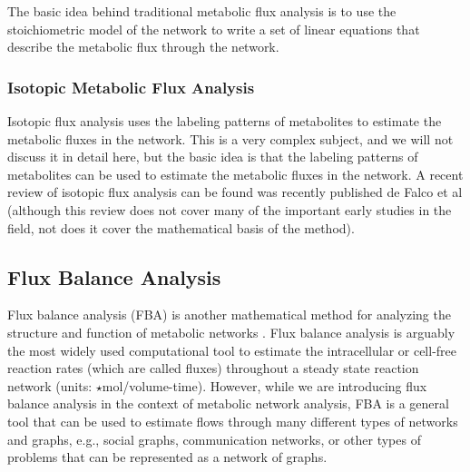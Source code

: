 \documentclass{article}[11pt]
\begin{document}
The basic idea behind traditional metabolic flux analysis is to use the stoichiometric model of the network to write a set of linear equations that describe the metabolic flux through the network.


\subsubsection*{Isotopic Metabolic Flux Analysis}
Isotopic flux analysis uses the labeling patterns of metabolites to estimate the metabolic fluxes in the network.
This is a very complex subject, and we will not discuss it in detail here, but the basic idea is that the labeling patterns of metabolites can be used to estimate the metabolic fluxes in the network.
A recent review of isotopic flux analysis can be found was recently published de Falco et al \cite{D2RA03326G} (although this review does not cover many of the important early studies in the field, not does it cover the mathematical basis of the method).


\subsection{Flux Balance Analysis}
Flux balance analysis (FBA) is another mathematical method for analyzing the structure and function of metabolic networks \cite{Orth:2010aa}.
Flux balance analysis is arguably the most widely used computational tool to estimate the intracellular or cell-free reaction rates (which are called fluxes) 
throughout a steady state reaction network (units: $\star$mol/volume-time). 
However, while we are introducing flux balance analysis in the context of metabolic network analysis, FBA is a general tool that can be used to 
estimate flows through many different types of networks and graphs, e.g., social graphs, communication networks, or other types of problems that can be represented as a network of graphs.  
\end{document}
